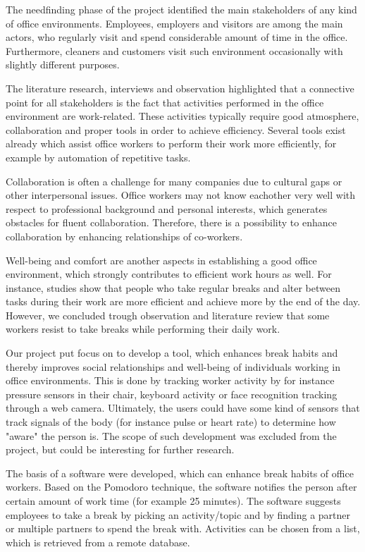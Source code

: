 The needfinding phase of the project identified the main stakeholders of any kind of office environments. Employees, employers and visitors are among the main actors, who regularly visit and spend considerable amount of time in the office. Furthermore, cleaners and customers visit such environment occasionally with slightly different purposes. 

The literature research, interviews and observation highlighted that a connective point for all stakeholders is the fact that activities performed in the office environment are work-related. These activities typically require good atmosphere, collaboration and proper tools in order to achieve efficiency. Several tools exist already which assist office workers to perform their work more efficiently, for example by automation of repetitive tasks. 

Collaboration is often a challenge for many companies due to cultural gaps or other interpersonal issues. Office workers may not know eachother very well with respect to professional background and personal interests, which generates obstacles for fluent collaboration. Therefore, there is a possibility to enhance collaboration by enhancing relationships of co-workers.

Well-being and comfort are another aspects in establishing a good office environment, which strongly contributes to efficient work hours as well. For instance, studies show that people who take regular breaks and alter between tasks during their work are more efficient and achieve more by the end of the day. However, we concluded trough observation and literature review that some workers resist to take breaks while performing their daily work. 

Our project put focus on to develop a tool, which enhances break habits and thereby improves social relationships and well-being of individuals working in office environments. This is done by tracking worker activity by for instance pressure sensors in their chair, keyboard activity or face recognition tracking through a web camera. Ultimately, the users could have some kind of sensors that track signals of the body (for instance pulse or heart rate) to determine how "aware" the person is. The scope of such development was excluded from the project, but could be interesting for further research. 

The basis of a software were developed, which can enhance break habits of office workers. Based on the Pomodoro technique, the software notifies the person after certain amount of work time (for example 25 minutes). The software suggests employees to take a break by picking an activity/topic and by finding a partner or multiple partners to spend the break with. Activities can be chosen from a list, which is retrieved from a remote database. 

